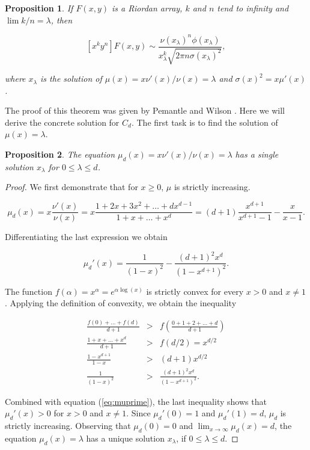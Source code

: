 \documentclass{article}
\newtheorem{proposition}{Proposition}
\begin{document}
\begin{proposition}
\label{th:PW}
If $F(x,y)$ is a Riordan array, $k$ and $n$ tend to infinity and $\lim k/n
= \lambda$, then

\begin{equation}
\label{eq:Cd}
[x^ky^n]F(x,y) \sim \frac{\nu(x_\lambda)^n\phi(x_\lambda)}
  {x_\lambda^k\sqrt{2\pi n \sigma(x_\lambda)^2}},
\end{equation}

\noindent
where $x_\lambda$ is the solution of
$\mu(x) = x\nu'(x)/\nu(x) = \lambda$ and $\sigma(x)^2 = x \mu'(x)$.
\end{proposition}

The proof of this theorem was given by Pemantle and Wilson
\cite{PemWil08}. Here we will derive the concrete solution for $C_d$. The
first task is to find the solution of $\mu(x) = \lambda$.

\begin{proposition}
\label{th:mu}
The equation $\mu_d(x) = x\nu'(x)/\nu(x) = \lambda$ has a single solution
$x_\lambda$ for $0 \leq \lambda \leq d$.
\end{proposition}

\begin{proof}
We first demonstrate that for $x \geq 0$, $\mu$ is strictly increasing.

\begin{equation}
\label{eq:mu}
\mu_d(x) = x\frac{\nu'(x)}{\nu(x)} =
x\frac{1+2x+3x^2+\ldots+dx^{d-1}}{1+x+\ldots+x^d} =
(d+1)\frac{x^{d+1}}{x^{d+1}-1} - \frac{x}{x-1}.
\end{equation} 

Differentiating the last expression we obtain

\begin{equation}
\label{eq:muprime}
\mu_d'(x) = \frac{1}{(1-x)^2} -\frac{(d+1)^2x^d}{(1-x^{d+1})^2}.
\end{equation}

The function $f(\alpha) = x^{\alpha} = e^{\alpha \log(x)}$ is strictly
convex for every $x > 0$ and $x \neq 1$. Applying the definition of
convexity, we obtain the inequality

\begin{eqnarray*}
\frac{f(0)+\ldots+f(d)}{d+1} &>&
f\left(\frac{0+1+2+\ldots+d}{d+1}\right) \\
\frac{1+x+\ldots+x^d}{d+1} &>& f(d/2) = x^{d/2} \\
\frac{1-x^{d+1}}{1-x} &>& (d+1)x^{d/2} \\
\frac{1}{(1-x)^2} &>& \frac{(d+1)^2x^d}{(1-x^{d+1})^2}.
\end{eqnarray*}

Combined with equation (\ref{eq:muprime}), the last inequality shows that
$\mu_d'(x) > 0$ for $x > 0$ and $x \neq 1$. Since $\mu_d'(0) = 1$ and
$\mu_d'(1) = d$, $\mu_d$ is strictly increasing. Observing that $\mu_d(0)
= 0$ and $\lim_{x\rightarrow\infty} \mu_d(x) = d$, the equation $\mu_d(x)
= \lambda$ has a unique solution $x_\lambda$, if $0 \leq \lambda \leq
d$.
\end{proof}
\end{document}
